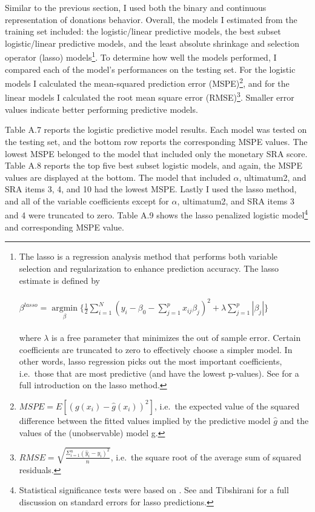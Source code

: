 \documentclass[12pt]{article}
\begin{document}
Similar to the previous section, I used both the binary and continuous representation of donations behavior. Overall, the models I estimated from the training set included: the logistic/linear predictive models, the best subset logistic/linear predictive models, and the least absolute shrinkage and selection operator (lasso) models\footnote{The lasso is a regression analysis method that performs both variable selection and regularization to enhance prediction accuracy. The lasso estimate is defined by\\ \\
\( \beta^{lasso}=\mathop\mathrm{argmin}\limits_{\beta} \{ \frac{1}{2} \sum_{i=1}^{N} (y_{i} - \beta_{0} - \sum_{j=1}^{p}x_{ij}\beta _{j})^{2}+\lambda\sum_{j=1}^{p}|\beta _{j}|\} \) \\ \\
where \(\lambda\) is a free parameter that minimizes the out of sample error. Certain coefficients are truncated to zero to effectively choose a simpler model. In other words, lasso regression picks out the most important coefficients, i.e.\ those that are most predictive (and have the lowest p-values). See \cite{tibshirani_1996} for a full introduction on the lasso method.}. To determine how well the models performed, I compared each of the model's performances on the testing set. For the logistic models I calculated the mean-squared prediction error (MSPE)\footnote{\(MSPE = E[(g(x_{i}) - \hat{g}(x_{i}))^{2}]\), i.e.\ the expected value of the squared difference between the fitted values implied by the predictive model \(\hat{g}\) and the values of the (unobservable) model g.}, and for the linear models I calculated the root mean square error (RMSE)\footnote{\(RMSE = \sqrt{\frac{\Sigma_{i=1}^{n}{(\hat{y}_{i} - y_{i})^2}}{n}}\), i.e.\ the square root of the average sum of squared residuals.}. Smaller error values indicate better performing predictive models.

Table A.7 reports the logistic predictive model results. Each model was tested on the testing set, and the bottom row reports the corresponding MSPE values. The lowest MSPE belonged to the model that included only the monetary SRA score. Table A.8 reports the top five best subset logistic models, and again, the MSPE values are displayed at the bottom. The model that included \(\alpha\), ultimatum2, and SRA items 3, 4, and 10 had the lowest MSPE. Lastly I used the lasso method, and all of the variable coefficients except for \(\alpha\), ultimatum2, and SRA items 3 and 4 were truncated to zero. Table A.9 shows the lasso penalized logistic model\footnote{Statistical significance tests were based on \cite{lockhart_2014}. See \cite{kyung_2010} and Tibshirani for a full discussion on standard errors for lasso predictions.} and corresponding MSPE value.
\end{document}

